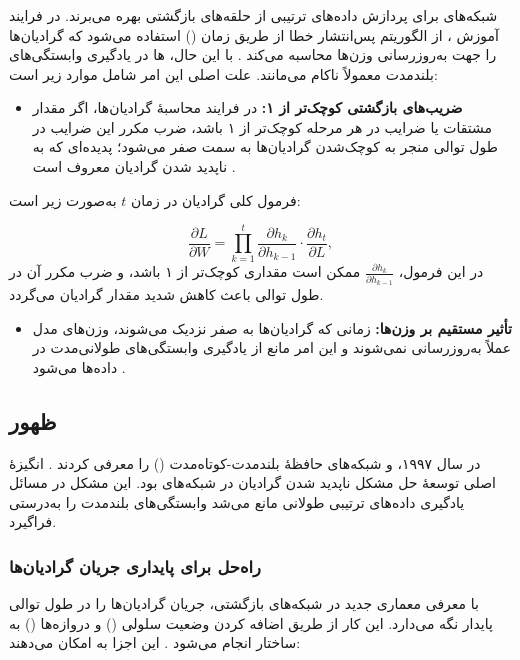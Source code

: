 \subsubsection{}
شبکه‌های  برای پردازش داده‌های ترتیبی از حلقه‌های بازگشتی بهره می‌برند. در فرایند آموزش ، از الگوریتم پس‌انتشار خطا از طریق زمان () استفاده می‌شود که گرادیان‌ها را جهت به‌روزرسانی وزن‌ها محاسبه می‌کند
\cite{rumelhart1986learning}.
با این حال، ها در یادگیری وابستگی‌های بلندمدت معمولاً ناکام می‌مانند. علت اصلی این امر شامل موارد زیر است:

\begin{itemize}
	\item \textbf{ضریب‌های بازگشتی کوچک‌تر از ۱:}
	در فرایند محاسبهٔ گرادیان‌ها، اگر مقدار مشتقات یا ضرایب در هر مرحله کوچک‌تر از ۱ باشد، ضرب مکرر این ضرایب در طول توالی منجر به کوچک‌شدن گرادیان‌ها به سمت صفر می‌شود؛ پدیده‌ای که به ناپدید شدن گرادیان معروف است
	\cite{hochreiter1998vanishing}.
\end{itemize}

فرمول کلی گرادیان در زمان \( t \) به‌صورت زیر است:

\[
\frac{\partial L}{\partial W} = \prod_{k=1}^{t} \frac{\partial h_k}{\partial h_{k-1}} \cdot \frac{\partial h_t}{\partial L},
\]
در این فرمول، \( \frac{\partial h_k}{\partial h_{k-1}} \) ممکن است مقداری کوچک‌تر از ۱ باشد، و ضرب مکرر آن در طول توالی باعث کاهش شدید مقدار گرادیان می‌گردد.

\begin{itemize}
	\item \textbf{تأثیر مستقیم بر وزن‌ها:}
	زمانی که گرادیان‌ها به صفر نزدیک می‌شوند، وزن‌های مدل عملاً به‌روزرسانی نمی‌شوند و این امر مانع از یادگیری وابستگی‌های طولانی‌مدت در داده‌ها می‌شود
	\cite{goodfellow2016deep}.
\end{itemize}

\subsection{ظهور }
در سال ۱۹۹۷،  و  شبکه‌های حافظهٔ بلندمدت-کوتاه‌مدت () را معرفی کردند
\cite{hochreiter1997long}.
انگیزهٔ اصلی توسعهٔ  حل مشکل ناپدید شدن گرادیان در شبکه‌های  بود. این مشکل در مسائل یادگیری داده‌های ترتیبی طولانی مانع می‌شد  وابستگی‌های بلندمدت را به‌درستی فراگیرد.

\subsubsection{راه‌حل  برای پایداری جریان گرادیان‌ها}
 با معرفی معماری جدید در شبکه‌های بازگشتی، جریان گرادیان‌ها را در طول توالی پایدار نگه می‌دارد. این کار از طریق اضافه کردن وضعیت سلولی () و دروازه‌ها () به ساختار  انجام می‌شود
\cite{gers1999learning}.
این اجزا به  امکان می‌دهند:

